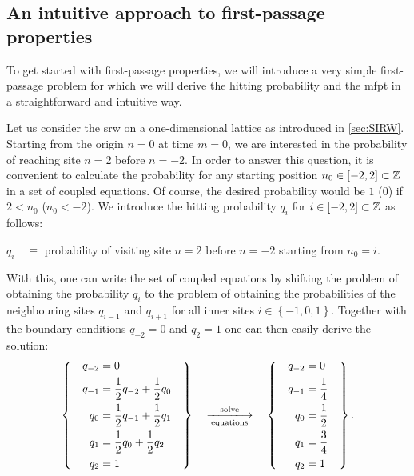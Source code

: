 \subsection{An intuitive approach to first-passage properties}\label{ssec:intApproach}
To get started with first-passage properties, we will introduce a very simple first-passage problem for which we will derive the hitting probability and the \ac{mfpt} in a straightforward and intuitive way.

Let us consider the \ac{srw} on a one-dimensional lattice as introduced in \autoref{sec:SIRW}. Starting from the origin $n=0$ at time $m=0$, we are interested in the probability of reaching site $n=2$ before \mbox{$n=-2$}. In order to answer this question, it is convenient to calculate the probability for any starting position $n_0\in\left[-2,2\right]\subset\operatorname{\mathbb{Z}}$ in a set of coupled equations. Of course, the desired probability would be $1$ ($0$) if $2 < n_0$ ($n_0 < -2$). We introduce the hitting probability $q_i$ for $i\in\left[-2,2\right]\subset\operatorname{\mathbb{Z}}$ as follows:
\begin{center}
 $q_i \quad \equiv$ \quad probability of visiting site $n=2$ before $n=-2$ starting from $n_0=i$.
\end{center}
With this, one can write the set of coupled equations by shifting the problem of obtaining the probability $q_i$ to the problem of obtaining the probabilities of the neighbouring sites $q_{i-1}$ and $q_{i+1}$ for all inner sites $i \in \left\{-1,0,1\right\}$. Together with the boundary conditions $q_{-2}=0$ and $q_2=1$ one can then easily derive the solution:
\begin{equation*}
 \left\{\quad
 \begin{aligned}
  q_{-2} &= 0
  \\
  q_{-1} &= \frac{1}{2}q_{-2}+\frac{1}{2}q_{0}
  \\
  q_{0} &= \frac{1}{2}q_{-1}+\frac{1}{2}q_{1}
  \\
  q_{1} &= \frac{1}{2}q_{0}+\frac{1}{2}q_{2}
  \\
  q_{2} &= 1  
 \end{aligned}
 \quad
 \right\} \quad \xlongrightarrow[\textrm{equations}]{\textrm{solve}} \quad \left\{\quad
 \begin{aligned}
  q_{-2} &= 0
  \\
  q_{-1} &= \frac{1}{4}
  \\
  q_{0} &= \frac{1}{2}
  \\
  q_{1} &= \frac{3}{4}
  \\
  q_{2} &= 1
 \end{aligned}
 \quad
 \right\}.
\end{equation*}
